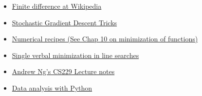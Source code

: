 \documentclass[titlepage]{tufte-book}
\begin{document}
\begin{fullwidth}
\begin{itemize}
\item \href{http://en.wikipedia.org/wiki/Finite_difference}{Finite difference at Wikipedia}
\item \href{http://research.microsoft.com/pubs/192769/tricks-2012.pdf}{Stochastic Gradient Descent Tricks}
\item \href{http://apps.nrbook.com/fortran/index.html}{Numerical recipes (See Chap 10 on minimization of functions)}
\item \href{http://adl.stanford.edu/aa222/Lecture_Notes_files/AA222-Lecture2.pdf}{Single verbal minimization in line searches}
\item \href{http://cs229.stanford.edu/notes/cs229-notes1.pdf}{Andrew Ng's CS229 Lecture notes}
\item \href{http://people.duke.edu/~ccc14/pcfb/analysis.html}{Data analysis with Python}
\end{itemize}

\end{fullwidth}
\end{document}
